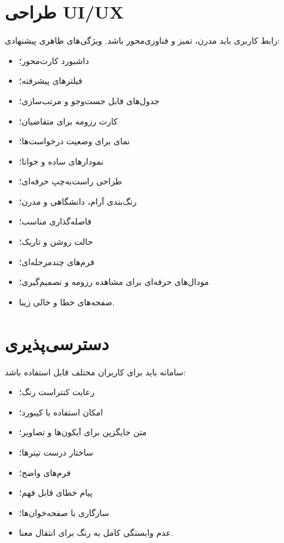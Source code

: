 \documentclass[12pt,a4paper]{article}
\begin{document}
\section{طراحی UI/UX}
رابط کاربری باید مدرن، تمیز و فناوری‌محور باشد. ویژگی‌های ظاهری پیشنهادی:
\begin{itemize}
\item داشبورد کارت‌محور؛
\item فیلترهای پیشرفته؛
\item جدول‌های قابل جست‌وجو و مرتب‌سازی؛
\item کارت رزومه برای متقاضیان؛
\item نمای  برای وضعیت درخواست‌ها؛
\item نمودارهای ساده و خوانا؛
\item طراحی راست‌به‌چپ حرفه‌ای؛
\item رنگ‌بندی آرام، دانشگاهی و مدرن؛
\item فاصله‌گذاری مناسب؛
\item حالت روشن و تاریک؛
\item فرم‌های چندمرحله‌ای؛
\item مودال‌های حرفه‌ای برای مشاهده رزومه و تصمیم‌گیری؛
\item صفحه‌های خطا و خالی زیبا.
\end{itemize}

\section{دسترسی‌پذیری}
سامانه باید برای کاربران مختلف قابل استفاده باشد:
\begin{itemize}
\item رعایت کنتراست رنگ؛
\item امکان استفاده با کیبورد؛
\item متن جایگزین برای آیکون‌ها و تصاویر؛
\item ساختار درست تیترها؛
\item فرم‌های واضح؛
\item پیام خطای قابل فهم؛
\item سازگاری با صفحه‌خوان‌ها؛
\item عدم وابستگی کامل به رنگ برای انتقال معنا.
\end{itemize}
\end{document}
